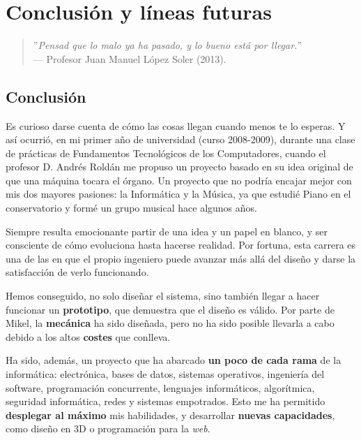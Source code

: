 \chapter{Conclusión y líneas futuras}
\label{cap:capitulo7}

\begin{quote}
	\begin{flushright}
		\small ''\textit{Pensad que lo malo ya ha pasado, y lo bueno está por llegar.}'' \\
		--- Profesor Juan Manuel López Soler (2013).
	\end{flushright}
\end{quote}

\newpage

\section{Conclusión}

Es curioso darse cuenta de cómo las cosas llegan cuando menos te lo esperas. Y así ocurrió, en mi primer año de universidad (curso 2008-2009), durante una clase de prácticas de Fundamentos Tecnológicos de los Computadores, cuando el profesor D. Andrés Roldán me propuso un proyecto basado en su idea original de que una máquina tocara el órgano. Un proyecto que no podría encajar mejor con mis dos mayores pasiones: la Informática y la Música, ya que estudié Piano en el conservatorio y formé un grupo musical hace algunos años.

Siempre resulta emocionante partir de una idea y un papel en blanco, y ser consciente de cómo evoluciona hasta hacerse realidad. Por fortuna, esta carrera es una de las en que el propio ingeniero puede avanzar más allá del diseño y darse la satisfacción de verlo funcionando.

Hemos conseguido, no solo diseñar el sistema, sino también llegar a hacer funcionar un \textbf{prototipo}, que demuestra que el diseño es válido. Por parte de Mikel, la \textbf{mecánica} ha sido diseñada, pero no ha sido posible llevarla a cabo debido a los altos \textbf{costes} que conlleva.

Ha sido, además, un proyecto que ha abarcado \textbf{un poco de cada rama} de la informática: electrónica, bases de datos, sistemas operativos, ingeniería del software, programación concurrente, lenguajes informáticos, algorítmica, seguridad informática, redes y sistemas empotrados. Esto me ha permitido \textbf{desplegar al máximo} mis habilidades, y desarrollar \textbf{nuevas capacidades}, como diseño en 3D o programación para la \textit{web}.

